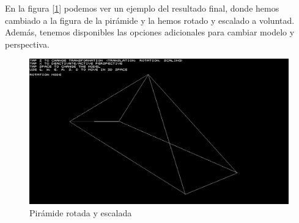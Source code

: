 En la figura [\ref{fig:geometry}] podemos ver un ejemplo del resultado final, donde hemos cambiado a la figura de la pirámide y la hemos rotado y escalado a voluntad. Además, tenemos disponibles las opciones adicionales para cambiar modelo y perspectiva.

\begin{figure}[h]
	\centering
	\includegraphics[width=12cm]{archivos/geometry}
	\caption{Pirámide rotada y escalada}
	\label{fig:geometry}
\end{figure}

